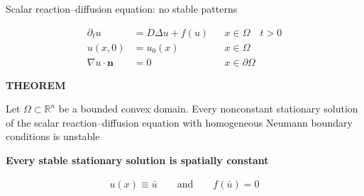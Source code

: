 \begin{frame}{Scalar reaction--diffusion equation: no stable patterns}


\begin{center}
  \begin{minipage}{0.88\textwidth}

    \vspace{-0.20cm}

    {\color{HydraWhite}\fontsize{9.8}{12.5}\selectfont
    \begin{align*}
      \partial_tu
      &=
      D\Delta u+f(u)
      &&
      x\in\Omega
      \quad
      t>0
      \\
      u(x,0)
      &=
      u_0(x)
      &&
      x\in\Omega
      \\
      \nabla u\cdot\mathbf n
      &=
      0
      &&
      x\in\partial\Omega
    \end{align*}
    }
  \end{minipage}
\end{center}

\vspace{0.58cm}

\begin{center}
  \begin{minipage}{0.88\textwidth}

    {\color{HydraGold}\bfseries\fontsize{9.2}{11}\selectfont
      THEOREM
    \par}

    \vspace{0.14cm}

    {\color{HydraWhite}\fontsize{9}{11.5}\selectfont
      Let $\Omega\subset\mathbb R^n$ be a bounded convex domain.
      Every nonconstant stationary solution of the scalar
      reaction--diffusion equation with homogeneous Neumann
      boundary conditions is unstable
    \par}

    \vspace{0.28cm}

    {\color{HydraCyan}\bfseries\fontsize{9.4}{12}\selectfont
      Every stable stationary solution is spatially constant
    \par}

    \vspace{-0.14cm}

    {\color{HydraWhite}\fontsize{10.4}{13.2}\selectfont
    \begin{align*}
      u(x)\equiv\bar u
      \qquad \text{and} \qquad
      f(\bar u)=0
    \end{align*}
    }

  \end{minipage}
\end{center}

\vfill


\end{frame}




